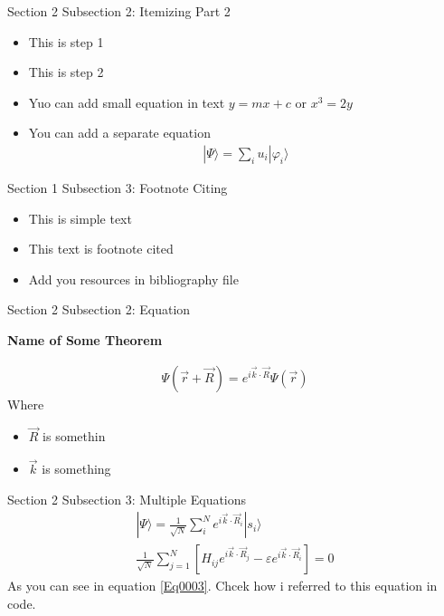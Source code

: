 \documentclass[aspectratio=169, 9pt]{beamer}
\begin{document}
\begin{frame}{Section 2 Subsection 2: Itemizing Part 2}
\begin{itemize}
    \item[Step 1] This is step 1
    \item[Step 2] This is step 2
    \item[Step 3] Yuo can add small equation in text $y=mx+c$ or $x^{3}=2y$
    \item[Step 4] You can add a separate equation
        \begin{align*}
        |\Psi \rangle = \sum_{i} u_{i} | \varphi_{i} \rangle 
    \end{align*}
\end{itemize}
\end{frame}




\begin{frame}{Section 1 Subsection 3: Footnote Citing}
\begin{itemize}
    \item This is simple text
    \item This text is footnote cited \footnotemark
    \item Add you resources in bibliography file 
\end{itemize}
\end{frame}




\begin{frame}{Section 2 Subsection 2: Equation}
    \begin{flushleft}
    \textbf{Name of Some Theorem}
    \end{flushleft} 
    \begin{align}
         \Psi (\Vec{r}+ \Vec{R}) = e^{i\Vec{k}\cdot\Vec{R}}\Psi(\Vec{r})
    \end{align}
    Where
    \begin{itemize}
        \item $\Vec{R}$ is somethin
        \item $\Vec{k}$ is something
    \end{itemize}
\end{frame}



\begin{frame}{Section 2 Subsection 3: Multiple Equations}
    \begin{align}
        |\Psi \rangle = \frac{1}{\sqrt{N}} \sum_{i}^{N} e^{i\Vec{k}\cdot\Vec{R}_{i}}|s_{i}\rangle \label{Wavefunc} \\ 
        \frac{1}{\sqrt{N}} \sum_{j=1}^{N} \left[ H_{ij}e^{i\Vec{k}\cdot\Vec{R}_{j}}-\varepsilon e^{i\Vec{k}\cdot\Vec{R}_{i}}\right] = 0 \label{Eq0003}
    \end{align}
    As you can see in equation \ref{Eq0003}. Chcek how i referred to this equation in code. 
\end{frame}
\end{document}
